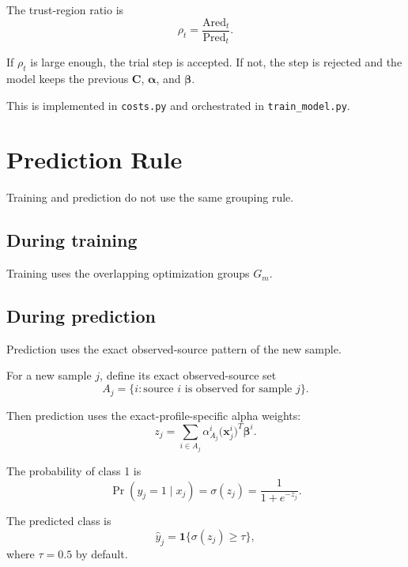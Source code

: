 \documentclass[11pt]{article}
\newcommand{\betai}{\boldsymbol{\beta}^i}
\newcommand{\betavec}{\boldsymbol{\beta}}
\newcommand{\alphavec}{\boldsymbol{\alpha}}
\newcommand{\costvec}{\mathbf{C}}
\newcommand{\sigmoid}{\sigma}
\begin{document}
The trust-region ratio is
\begin{equation}
\label{eq:trust-region-ratio}
\rho_t
=
\frac{\mathrm{Ared}_t}{\mathrm{Pred}_t}.
\end{equation}

If $\rho_t$ is large enough, the trial step is accepted. If not, the step is
rejected and the model keeps the previous $\costvec$, $\alphavec$, and
$\betavec$.

This is implemented in \texttt{costs.py} and orchestrated in
\texttt{train\_model.py}.

\section{Prediction Rule}

Training and prediction do not use the same grouping rule.

\subsection{During training}

Training uses the overlapping optimization groups $G_m$.

\subsection{During prediction}

Prediction uses the exact observed-source pattern of the new sample.

For a new sample $j$, define its exact observed-source set
\begin{equation}
\label{eq:prediction-exact-set}
A_j = \{ i : \text{source } i \text{ is observed for sample } j \}.
\end{equation}

Then prediction uses the exact-profile-specific alpha weights:
\begin{equation}
\label{eq:prediction-score}
z_j
=
\sum_{i \in A_j}
\alpha_{A_j}^i
\big(\mathbf{x}_j^i\big)^T
\betai.
\end{equation}

The probability of class 1 is
\begin{equation}
\label{eq:prediction-probability}
\Pr(y_j = 1 \mid x_j)
=
\sigmoid(z_j)
=
\frac{1}{1 + e^{-z_j}}.
\end{equation}

The predicted class is
\begin{equation}
\label{eq:prediction-threshold}
\hat{y}_j
=
\mathbf{1}\{\sigmoid(z_j) \ge \tau\},
\end{equation}
where $\tau = 0.5$ by default.
\end{document}
